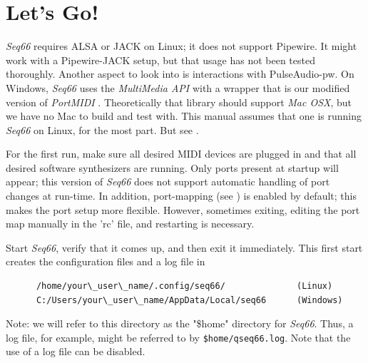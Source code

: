 %
%
%

\section{Let's Go!}
\label{sec:introduction_lets_go}

   \textsl{Seq66} requires ALSA or JACK on Linux;
   it does not support
   Pipewire.
   It might work with a Pipewire-JACK setup, but that usage has not been
   tested thoroughly.
   Another aspect to look into is interactions with
   PulseAudio-pw.
   On Windows, \textsl{Seq66} uses the \textsl{MultiMedia API} with a wrapper
   that is our modified version of \textsl{PortMIDI} \cite{portmidi}.
   Theoretically that library should support
   \textsl{Mac OSX}, but we have no Mac to build and test with.
   This manual assumes that one is running \textsl{Seq66} on Linux, for the
   most part.
   But see .

   For the first run, make sure all desired MIDI devices are plugged in and
   that all desired software synthesizers are running.
   Only ports present at startup will appear; this version of
   \textsl{Seq66} does not
   support automatic handling of port changes at run-time.
   In addition, port-mapping (see ) is
   enabled by default; this makes the port setup more flexible.
   However, sometimes exiting, editing the port map manually in the 'rc' file,
   and restarting is necessary.

   Start \textsl{Seq66}, verify that it comes up, and then exit it
   immediately.
   This first start creates the configuration files and a log file in

   \begin{verbatim}
      /home/your\_user\_name/.config/seq66/              (Linux)
      C:/Users/your\_user\_name/AppData/Local/seq66      (Windows)
   \end{verbatim}

   Note: we will refer to this directory as the "\$home" directory
   for \textsl{Seq66}.
   Thus, a log file, for example, might be referred to by
   \texttt{\$home/qseq66.log}.
   Note that the use of a log file can be disabled.


